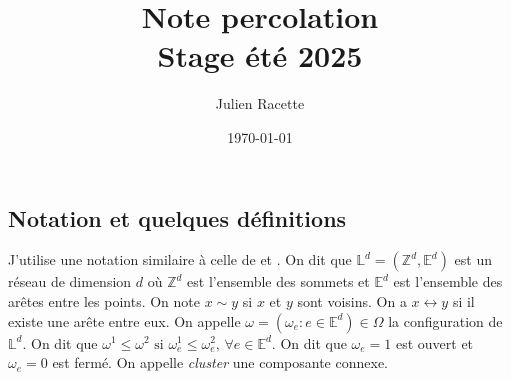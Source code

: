 


\pagestyle{fancy}
\fancyhead[r]{\today}
\fancyfoot[c]{\thepage}
\renewcommand{\headrulewidth}{0.2pt}
\setlength{\headheight}{15pt} 

\title{Note percolation\\ Stage été 2025}
\author{Julien Racette}
\date{\today}
\makeatletter
\renewcommand{\maketitle}{
    \begin{titlepage}
        \vspace*{\fill} %
        \begin{center}
        {\LARGE\bfseries \@title \par} %
            \vspace{1.5em}
            {\large \@author \par} %
            \vspace{1em}
            {\large \@date \par} %
        \end{center}
        \vspace*{\fill} %
    \end{titlepage}
}
\makeatother
\maketitle
\tableofcontents
\pagebreak

\subsection{Notation et quelques définitions}
J'utilise une notation similaire à celle de  \cite{duminilcopin2022introduction} et \cite{grimmett1999percolation}. On dit que $\mathbb{L}^d = (\mathbb{Z}^d,\mathbb{E}^d)$ est un réseau de dimension $d$ où $\mathbb{Z}^d$ est l'ensemble des sommets et $\mathbb{E}^d$ est l'ensemble des arêtes entre les points. On note $x \sim y$ si $x$ et $y$ sont voisins. On a  $x\leftrightarrow y$ si il existe une arête entre eux. On appelle $\omega=(\omega_e:e\in \mathbb{E}^d) \in \Omega$ la configuration de $\mathbb{L}^d$. On dit que $\omega^1 \leq \omega^2 \text{ si } \omega^1_e \leq \omega^2_e \text{, }\forall e \in \mathbb{E}^d$.
On dit que $\omega_e = 1$ est ouvert et $\omega_e = 0$ est fermé. On appelle \textit{cluster} une composante connexe.


\nocite{heckel2010percolation}
\printbibliography



